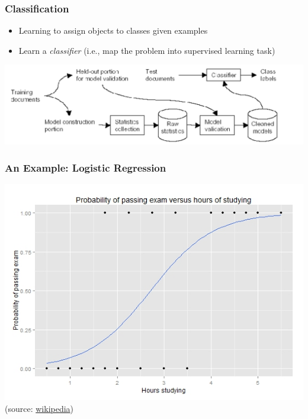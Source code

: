 \documentclass{beamer}
\begin{document}
\begin{frame}
  \frametitle{Classification}

  \begin{itemize}
  \item Learning to assign objects to classes given examples
  \item Learn a \emph{classifier} (i.e., map the problem into supervised learning task)
  \end{itemize}

  \vspace{5ex}

  \centering
  \includegraphics[width=\linewidth]{learning}

\end{frame}

\begin{frame}
    \frametitle{An Example: Logistic Regression}

    \includegraphics[width=.9\textwidth]{Exam_pass_logistic_curve}\\
    \hfill\footnotesize (source: \href{https://en.wikipedia.org/wiki/Logistic_regression}{wikipedia})
\end{frame}
\end{document}
